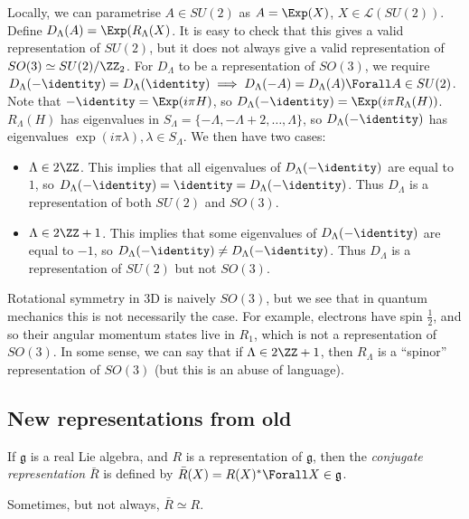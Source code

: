 \documentclass{jknotes}
\begin{document}
Locally, we can parametrise \(A \in SU(2)\) as \(A = \Exp(X)\), \(X \in \mathcal{L}(SU(2))\). Define \(D_\Lambda(A) = \Exp(R_\Lambda(X)\). It is easy to check that this gives a valid representation of \(SU(2)\), but it does not always give a valid representation of \(SO(3) \simeq SU(2)/\ZZ_2\). For \(D_\Lambda\) to be a representation of \(SO(3)\), we require \(D_\Lambda(-\identity) = D_\Lambda(\identity) \implies D_\Lambda(-A) = D_\Lambda(A) \Forall A \in SU(2)\). Note that \(-\identity = \Exp(i\pi H)\), so \(D_\Lambda(-\identity) = \Exp(i\pi R_\Lambda(H))\). \(R_\Lambda(H)\) has eigenvalues in \(S_\Lambda = \{-\Lambda,-\Lambda+2,\dots,\Lambda\}\), so \(D_\Lambda(-\identity)\) has eigenvalues \(\exp(i\pi\lambda),\lambda\in S_\Lambda\). We then have two cases:
\begin{itemize}
    \item \(\Lambda \in 2\ZZ\). This implies that all eigenvalues of \(D_\Lambda(-\identity)\) are equal to \(1\), so \(D_\Lambda(-\identity) = \identity = D_\Lambda(-\identity)\). Thus \(D_\Lambda\) is a representation of both \(SU(2)\) and \(SO(3)\).
    \item \(\Lambda \in 2\ZZ+1\). This implies that some eigenvalues of \(D_\Lambda(-\identity)\) are equal to \(-1\), so \(D_\Lambda(-\identity) \ne D_\Lambda(-\identity)\). Thus \(D_\Lambda\) is a representation of \(SU(2)\) but not \(SO(3)\).
\end{itemize}

Rotational symmetry in 3D is naively \(SO(3)\), but we see that in quantum mechanics this is not necessarily the case. For example, electrons have spin \(\frac{1}{2}\), and so their angular momentum states live in \(R_1\), which is not a representation of \(SO(3)\). In some sense, we can say that if \(\Lambda \in 2\ZZ + 1\), then \(R_\Lambda\) is a ``spinor'' representation of \(SO(3)\) (but this is an abuse of language).

\subsection{New representations from old}
\begin{defn}
    If \(\mathfrak{g}\) is a real Lie algebra, and \(R\) is a representation of \(\mathfrak{g}\), then the \emph{conjugate representation} \(\bar{R}\) is defined by \(\bar{R}(X) = R(X)^* \Forall X \in \mathfrak{g}\).
\end{defn}
Sometimes, but not always, \(\bar{R} \simeq R\).
\end{document}
